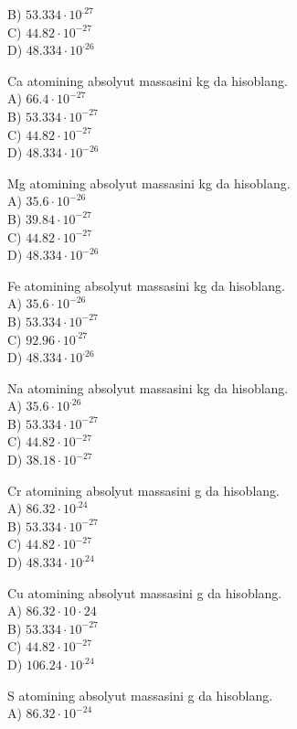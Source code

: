 B) $53.334 \cdot 10^{.27}$\\
C) $44.82 \cdot 10^{-27}$\\
D) $48.334 \cdot 10^{\cdot 26}$
  \item Ca atomining absolyut massasini kg da hisoblang.\\
A) $66.4 \cdot 10^{-27}$\\
B) $53.334 \cdot 10^{-27}$\\
C) $44.82 \cdot 10^{-27}$\\
D) $48.334 \cdot 10^{-26}$
  \item Mg atomining absolyut massasini kg da hisoblang.\\
A) $35.6 \cdot 10^{-26}$\\
B) $39.84 \cdot 10^{-27}$\\
C) $44.82 \cdot 10^{-27}$\\
D) $48.334 \cdot 10^{-26}$
  \item Fe atomining absolyut massasini kg da hisoblang.\\
A) $35.6 \cdot 10^{-26}$\\
B) $53.334 \cdot 10^{-27}$\\
C) $92.96 \cdot 10^{\cdot 27}$\\
D) $48.334 \cdot 10^{\cdot 26}$
  \item Na atomining absolyut massasini kg da hisoblang.\\
A) $35.6 \cdot 10^{\cdot 26}$\\
B) $53.334 \cdot 10^{-27}$\\
C) $44.82 \cdot 10^{-27}$\\
D) $38.18 \cdot 10^{-27}$
  \item Cr atomining absolyut massasini g da hisoblang.\\
A) $86.32 \cdot 10^{.24}$\\
B) $53.334 \cdot 10^{-27}$\\
C) $44.82 \cdot 10^{-27}$\\
D) $48.334 \cdot 10^{.24}$
  \item Cu atomining absolyut massasini g da hisoblang.\\
A) $86.32 \cdot 10 \cdot 24$\\
B) $53.334 \cdot 10^{-27}$\\
C) $44.82 \cdot 10^{-27}$\\
D) $106.24 \cdot 10^{.24}$
  \item S atomining absolyut massasini g da hisoblang.\\
A) $86.32 \cdot 10^{-24}$\\
